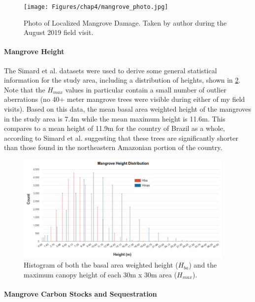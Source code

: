 \begin{figure}[!htb] 
\centering
\texttt{[image: Figures/chap4/mangrove\_photo.jpg]}
\caption[Photo of Localized Mangrove Damage]{Photo of Localized Mangrove Damage. Taken by author during the August 2019 field visit.}
\label{fig:mangrove_photo}
\end{figure}


\paragraph{Mangrove Height} \leavevmode\newline

The Simard et al. datasets were used to derive some general statistical information for the study area, including a distribution of heights, shown in \ref{fig:height_histogram}. Note that the $H_{max}$ values in particular contain a small number of outlier aberrations (no 40+ meter mangrove trees were visible during either of my field visits). Based on this data, the mean basal area weighted height of the mangroves in the study area is 7.4m while the mean maximum height is 11.6m. This compares to a mean height of 11.9m for the country of Brazil as a whole, according to Simard et al. \cite{simardMangroveCanopyHeight2019} suggesting that these trees are significantly shorter than those found in the northeastern Amazonian portion of the country.

\begin{figure}[!htb] 
\centering
\includegraphics[width=0.95\textwidth]{Figures/chap4/height_histogram.png}
\caption[Histogram of Mangrove Height in Region]{Histogram of both the basal area weighted height ($H_{ba}$) and the maximum canopy height of each 30m x 30m area ($H_{max}$).}
\label{fig:height_histogram}
\end{figure}

\paragraph{Mangrove Carbon Stocks and Sequestration} \leavevmode\newline

